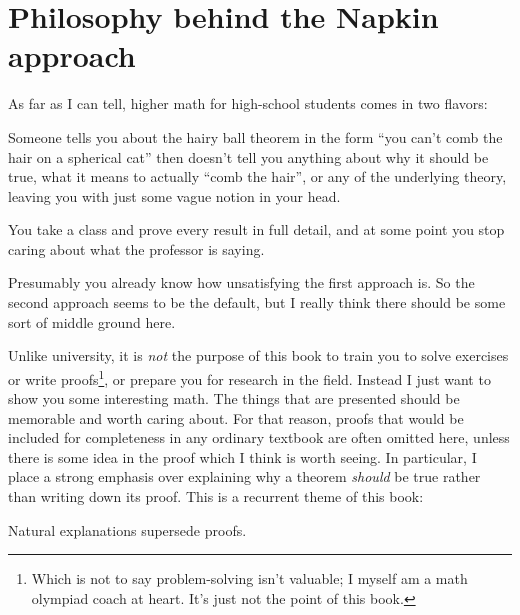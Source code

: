 \section*{Philosophy behind the Napkin approach}
As far as I can tell, higher math for high-school students
comes in two flavors:
\begin{itemize}
	\ii Someone tells you about the hairy ball theorem in the form
	``you can't comb the hair on a spherical cat''
	then doesn't tell you anything about why it should be true,
	what it means to actually ``comb the hair'',
	or any of the underlying theory,
	leaving you with just some vague notion in your head.

	\ii You take a class and prove every result in full detail,
	and at some point you stop caring about what the professor is saying.
\end{itemize}
Presumably you already know how unsatisfying the first approach is.
So the second approach seems to be the default,
but I really think there should be some sort of middle ground here.


Unlike university, it is \emph{not} the purpose of this book to
train you to solve exercises or write proofs\footnote{Which is
	not to say problem-solving isn't valuable;
	I myself am a math olympiad coach at heart.
	It's just not the point of this book.},
or prepare you for research in the field.
Instead I just want to show you some interesting math.
The things that are presented should be memorable and worth caring about.
For that reason, proofs that would be included for completeness
in any ordinary textbook are often omitted here,
unless there is some idea in the proof which I think is worth seeing.
In particular, I place a strong emphasis over explaining
why a theorem \emph{should} be true rather than writing down its proof.
This is a recurrent theme of this book:
\begin{moral}
	Natural explanations supersede proofs.
\end{moral}

